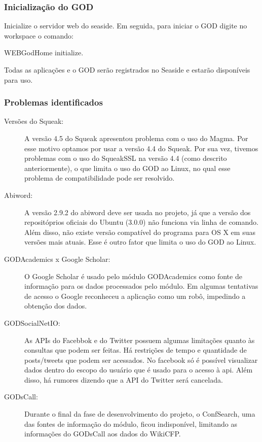 \subsubsection{Inicialização do GOD}

Inicialize o servidor web do seaside. Em seguida, para iniciar o GOD digite no workspace o comando:

\begin{godCode}
WEBGodHome initialize.
\end{godCode}

Todas as aplicações e o GOD serão registrados no Seaside e estarão disponíveis para uso.

\subsubsection{Problemas identificados}

\begin{description}
 \item[Versões do Squeak:] A versão 4.5 do Squeak apresentou problema com o uso do Magma. Por esse motivo optamos por usar a versão 4.4 do Squeak. 
 Por sua vez, tivemos problemas com o uso do SqueakSSL na versão 4.4 (como descrito anteriormente), o que limita o uso do GOD ao Linux, no qual esse 
 problema de compatibilidade pode ser resolvido.
 \item[Abiword:] A versão 2.9.2 do abiword deve ser usada no projeto, já que a versão dos repositóprios oficiais do Ubuntu (3.0.0) não funciona via 
 linha de comando. Além disso, não existe versão compatível do programa para OS X em suas versões mais atuais. Esse é outro fator que limita o uso do GOD 
 ao Linux.
 \item[GODAcademics x Google Scholar:] O Google Scholar é usado pelo módulo GODAcademics como fonte de informação para os dados processados pelo módulo. 
 Em algumas tentativas de acesso o Google reconheceu a aplicação como um robô, impedindo a obtenção dos dados.
 \item[GODSocialNetIO:] As APIs do Facebbok e do Twitter possuem algumas limitações quanto às consultas que podem ser feitas. Há restrições de tempo e quantidade 
 de posts/tweets que podem ser acessados. No facebook só é possível visualizar dados dentro do escopo do usuário que é usado para o acesso à api. Além disso, 
 há rumores dizendo que a API do Twitter será cancelada.
 \item[GODsCall:] Durante o final da fase de desenvolvimento do projeto, o ConfSearch, uma das fontes de informação do módulo, ficou indisponível, limitando as 
 informações do GODsCall aos dados do WikiCFP.
\end{description}


